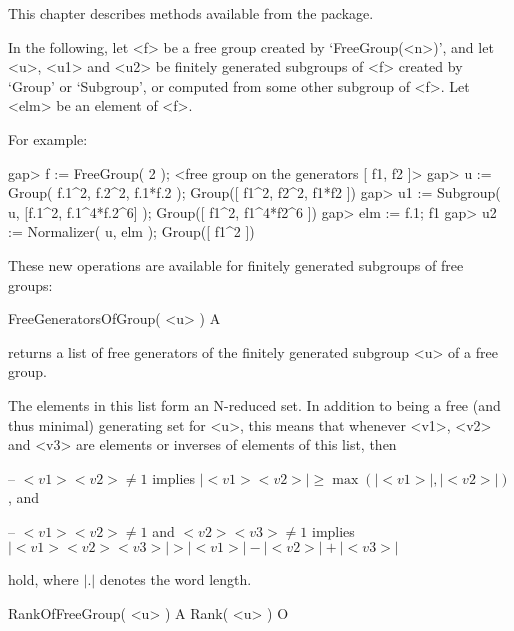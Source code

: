 


This chapter describes methods available from the {\FGA} package.

In the following, let <f> be a free group created by `FreeGroup(<n>)',
and let <u>, <u1> and <u2> be finitely generated subgroups of <f>
created by `Group' or `Subgroup', or computed from some other subgroup
of <f>.  Let <elm> be an element of <f>.

For example:

\beginexample
gap> f := FreeGroup( 2 );                                             
<free group on the generators [ f1, f2 ]>
gap> u := Group( f.1^2, f.2^2, f.1*f.2 );
Group([ f1^2, f2^2, f1*f2 ])
gap> u1 := Subgroup( u, [f.1^2, f.1^4*f.2^6] );
Group([ f1^2, f1^4*f2^6 ])
gap> elm := f.1;
f1
gap> u2 := Normalizer( u, elm );
Group([ f1^2 ])
\endexample


These new operations are available for finitely generated subgroups of
free groups:

\>FreeGeneratorsOfGroup( <u> ) A

returns a list of free generators of the finitely generated subgroup
<u> of a free group.

The elements in this list form an N-reduced set.  In addition to
being a free (and thus minimal) generating set for <u>, this means
that whenever <v1>, <v2> and <v3> are elements or inverses of elements
of this list, then

\beginlist%
  \item{--}
    $<v1><v2>\neq1$ implies $|<v1><v2>|\geq\max(|<v1>|, |<v2>|)$, and
  \item{--}
    $<v1><v2>\neq1$ and $<v2><v3>\neq1$ implies
    $|<v1><v2><v3>| > |<v1>| - |<v2>| + |<v3>|$
\endlist

hold, where $|.|$ denotes the word length.

\>RankOfFreeGroup( <u> ) A
\>Rank( <u> ) O

